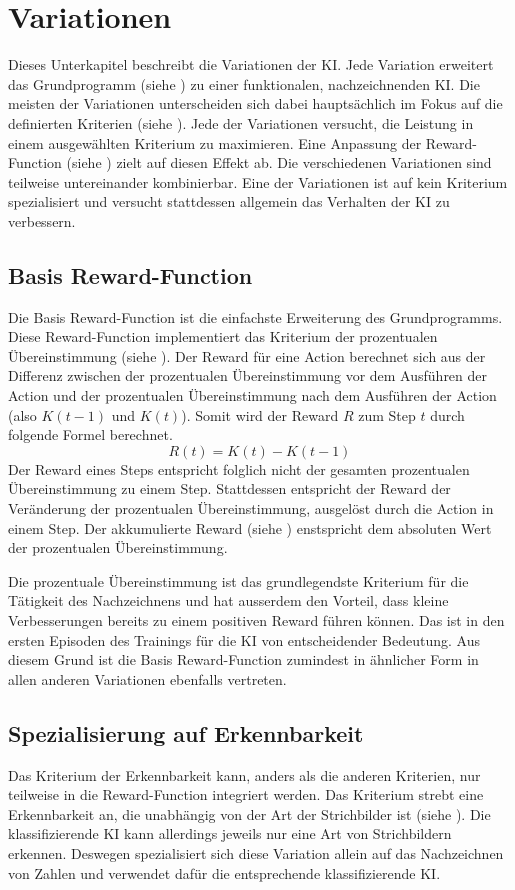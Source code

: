 \section{Variationen}\label{chap:m_var} Dieses Unterkapitel beschreibt die
Variationen der KI. Jede Variation erweitert das Grundprogramm (siehe
) zu einer funktionalen, nachzeichnenden KI. Die meisten
der Variationen unterscheiden sich dabei hauptsächlich im Fokus auf die
definierten Kriterien (siehe ). Jede der Variationen
versucht, die Leistung in einem ausgewählten Kriterium zu maximieren. Eine
Anpassung der Reward-Function (siehe ) zielt auf diesen
Effekt ab. Die verschiedenen Variationen sind teilweise untereinander
kombinierbar. Eine der Variationen ist auf kein Kriterium spezialisiert und
versucht stattdessen allgemein das Verhalten der KI zu verbessern.
 
\subsection{Basis Reward-Function}\label{sub:m_var_base} Die Basis
Reward-Function ist die einfachste Erweiterung des Grundprogramms. Diese
Reward-Function implementiert das Kriterium der prozentualen Übereinstimmung
(siehe ). Der Reward für eine Action berechnet sich
aus der Differenz zwischen der prozentualen Übereinstimmung vor dem Ausführen
der Action und der prozentualen Übereinstimmung nach dem Ausführen der Action
(also $K(t-1)$ und $K(t)$). Somit wird der Reward $R$ zum Step $t$ durch
folgende Formel berechnet.
\[ R(t) = K(t) - K(t-1) \] Der Reward eines Steps entspricht folglich nicht der
gesamten prozentualen Übereinstimmung zu einem Step. Stattdessen entspricht der
Reward der Veränderung der prozentualen Übereinstimmung, ausgelöst durch die
Action in einem Step. Der akkumulierte Reward (siehe )
enstspricht dem absoluten Wert der prozentualen Übereinstimmung. 

Die prozentuale Übereinstimmung ist das grundlegendste Kriterium für die
Tätigkeit des Nachzeichnens und hat ausserdem den Vorteil, dass kleine
Verbesserungen bereits zu einem positiven Reward führen können. Das ist in den
ersten Episoden des Trainings für die KI von entscheidender Bedeutung. Aus
diesem Grund ist die Basis Reward-Function zumindest in ähnlicher Form in allen
anderen Variationen ebenfalls vertreten.

\subsection{Spezialisierung auf Erkennbarkeit}\label{sub:m_var_rec} Das
Kriterium der Erkennbarkeit kann, anders als die anderen Kriterien, nur
teilweise in die Reward-Function integriert werden. Das Kriterium strebt eine
Erkennbarkeit an, die unabhängig von der Art der Strichbilder ist (siehe
). Die klassifizierende KI kann allerdings jeweils nur
eine Art von Strichbildern erkennen. Deswegen spezialisiert sich diese Variation
allein auf das Nachzeichnen von Zahlen und verwendet dafür die entsprechende
klassifizierende KI.

